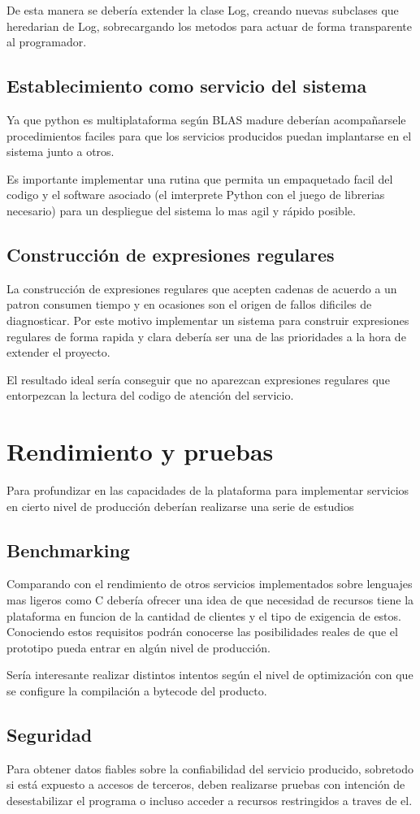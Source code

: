 \documentclass[a4paper,spanish,12pt]{book}
\begin{document}
De esta manera se debería extender la clase Log, creando nuevas subclases que heredarian de Log, sobrecargando los metodos para actuar de forma transparente al programador.


\subsection{Establecimiento como servicio del sistema}
Ya que python es multiplataforma según BLAS madure deberían acompañarsele procedimientos faciles para que los servicios producidos puedan implantarse en el sistema junto a otros.

Es importante implementar una rutina que permita un empaquetado facil del codigo y el software asociado (el imterprete Python con el juego de librerias necesario) para un despliegue del sistema lo mas agil y rápido posible.

\subsection{Construcción de expresiones regulares}
La construcción de expresiones regulares que acepten cadenas de acuerdo a un patron consumen tiempo y en ocasiones son el origen de fallos dificiles de diagnosticar. Por este motivo implementar un sistema para construir expresiones regulares de forma rapida y clara debería ser una de las prioridades a la hora de extender el proyecto.

El resultado ideal sería conseguir que no aparezcan expresiones regulares que entorpezcan la lectura del codigo de atención del servicio.
\section{Rendimiento y pruebas}
Para profundizar en las capacidades de la plataforma para implementar servicios en cierto nivel de producción deberían realizarse una serie de estudios
\subsection{Benchmarking}
Comparando con el rendimiento de otros servicios implementados sobre lenguajes mas ligeros como C debería ofrecer una idea de que necesidad de recursos tiene la plataforma en funcion de la cantidad de clientes y el tipo de exigencia de estos. Conociendo estos requisitos podrán conocerse las posibilidades reales de que el prototipo pueda entrar en algún nivel de producción.

Sería interesante realizar distintos intentos según el nivel de optimización con que se configure la compilación a bytecode del producto.


\subsection{Seguridad}
Para obtener datos fiables sobre la confiabilidad del servicio producido, sobretodo si está expuesto a accesos de terceros, deben realizarse pruebas con intención de desestabilizar el programa o incluso acceder a recursos restringidos a traves de el.
\end{document}
